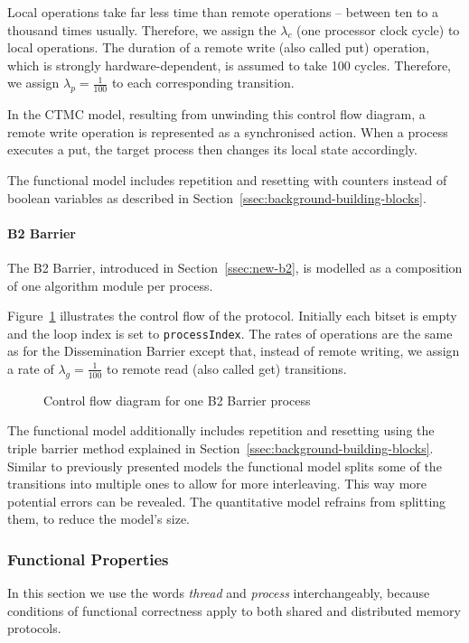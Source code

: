 \documentclass[a4paper, 10pt]{article}
\begin{document}
Local operations take far less time than remote operations -- between ten to a thousand times usually. Therefore, we assign the $\lambda_c$ (one processor clock cycle) to local operations.
The duration of a remote write (also called put) operation, which is strongly hardware-dependent, is assumed to take 100 cycles. Therefore, we assign $\lambda_p = \frac{1}{100}$ to each corresponding transition.

In the CTMC model, resulting from unwinding this control flow diagram, a remote write operation is represented as a synchronised action. When a process executes a put, the target process then changes its local state accordingly.

The functional model includes repetition and resetting with counters instead of boolean variables as described in Section~\ref{ssec:background-building-blocks}.

\paragraph{B2 Barrier}
\label{ssssec:analysis-modelchecking-modelling-b2}
The B2 Barrier, introduced in Section~\ref{ssec:new-b2}, is modelled as a composition of one algorithm module per process.

Figure~\ref{fig:model-b2} illustrates the control flow of the protocol.
Initially each bitset is empty and the loop index is set to \texttt{processIndex}.
The rates of operations are the same as for the Dissemination Barrier except that, instead of remote writing, we assign a rate of $\lambda_g = \frac{1}{100}$ to remote read (also called get) transitions.

\begin{figure}[htbp]
	\centering
	
	\caption{Control flow diagram for one B2 Barrier process}
	\label{fig:model-b2}
\end{figure}

The functional model additionally includes repetition and resetting using the triple barrier method explained in Section~\ref{ssec:background-building-blocks}.
Similar to previously presented models the functional model splits some of the transitions into multiple ones to allow for more interleaving. This way more potential errors can be revealed. The quantitative model refrains from splitting them, to reduce the model's size.

\subsubsection{Functional Properties}
\label{sssec:analysis-modelchecking-functional-properties}
In this section we use the words \emph{thread} and \emph{process} interchangeably, because conditions of functional correctness apply to both shared and distributed memory protocols.
\end{document}
